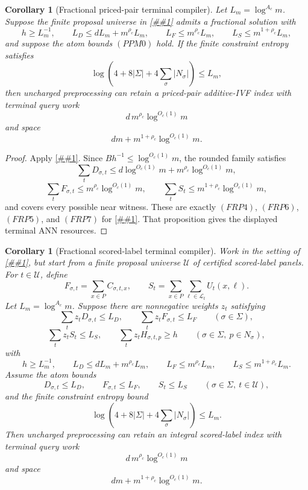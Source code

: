 \documentclass[10pt]{article}
\newcommand{\cref}[1]{\ref{##1}}
\newtheorem{corollary}[theorem]{Corollary}
\theoremstyle{definition}
\begin{document}
\begin{corollary}[Fractional priced-pair terminal compiler]
   \label{cor:fractional-priced-pair-terminal}
   Let \(L_m=\log^{A_c}m\).  Suppose the finite proposal universe in
   \cref{lem:finite-priced-pair-lp-dual} admits a fractional solution with
   \[
      h\ge L_m^{-1},
      \qquad
      L_D\le dL_m+m^{\rho_c}L_m,
      \qquad
      L_F\le m^{\rho_c}L_m,
      \qquad
      L_S\le m^{1+\rho_c}L_m,
   \]
   and suppose the atom bounds \((PPM0)\) hold.  If the finite constraint
   entropy satisfies
   \[
      \log\left(4+8|\Sigma|+4\sum_\sigma|N_\sigma|\right)
      \le L_m,
   \]
   then uncharged preprocessing can retain a priced-pair additive-IVF index
   with terminal query work
   \[
      d\,m^{\rho_c}\log^{O_c(1)}m
   \]
   and space
   \[
      dm+m^{1+\rho_c}\log^{O_c(1)}m .
   \]
\end{corollary}

\begin{proof}
   Apply \cref{lem:fractional-priced-pair-materialization}.  Since
   \(Bh^{-1}\le\log^{O_c(1)}m\), the rounded family satisfies
   \[
      \sum_tD_{\sigma,t}
      \le d\log^{O_c(1)}m+m^{\rho_c}\log^{O_c(1)}m,
   \]
   \[
      \sum_tF_{\sigma,t}\le m^{\rho_c}\log^{O_c(1)}m,
      \qquad
      \sum_tS_t\le m^{1+\rho_c}\log^{O_c(1)}m,
   \]
   and covers every possible near witness.  These are exactly
   \((FRP4)\), \((FRP6)\), \((FRP5)\), and \((FRP7)\) for
   \cref{prop:finite-retained-priced-pair}.  That proposition gives the
   displayed terminal ANN resources.
\end{proof}

\begin{corollary}[Fractional scored-label terminal compiler]
   \label{cor:fractional-scored-label-terminal}
   Work in the setting of \cref{prop:finite-retained-scored-label}, but start
   from a finite proposal universe \(\mathcal U\) of certified scored-label
   panels.  For \(t\in\mathcal U\), define
   \[
      F_{\sigma,t}=\sum_{x\in P}C_{\sigma,t,x},
      \qquad
      S_t=\sum_{x\in P}\sum_{\ell\in\mathcal L_t}U_t(x,\ell).
   \]
   Let \(L_m=\log^{A_c}m\).  Suppose there are nonnegative weights \(z_t\)
   satisfying
   \[
      \sum_tz_tD_{\sigma,t}\le L_D,
      \qquad
      \sum_tz_tF_{\sigma,t}\le L_F
      \qquad(\sigma\in\Sigma),
      \tag{FSLP1}
   \]
   \[
      \sum_tz_tS_t\le L_S,
      \qquad
      \sum_tz_tH_{\sigma,t,p}\ge h
      \qquad(\sigma\in\Sigma,\ p\in N_\sigma),
      \tag{FSLP2}
   \]
   with
   \[
      h\ge L_m^{-1},
      \qquad
      L_D\le dL_m+m^{\rho_c}L_m,
      \qquad
      L_F\le m^{\rho_c}L_m,
      \qquad
      L_S\le m^{1+\rho_c}L_m.
      \tag{FSLP3}
   \]
   Assume the atom bounds
   \[
      D_{\sigma,t}\le L_D,\qquad
      F_{\sigma,t}\le L_F,\qquad
      S_t\le L_S
      \qquad(\sigma\in\Sigma,\ t\in\mathcal U),
      \tag{FSLP4}
   \]
   and the finite constraint entropy bound
   \[
      \log\left(4+8|\Sigma|+4\sum_\sigma|N_\sigma|\right)
      \le L_m.
      \tag{FSLP5}
   \]
   Then uncharged preprocessing can retain an integral scored-label index with
   terminal query work
   \[
      d\,m^{\rho_c}\log^{O_c(1)}m
   \]
   and space
   \[
      dm+m^{1+\rho_c}\log^{O_c(1)}m .
   \]
\end{corollary}
\end{document}
